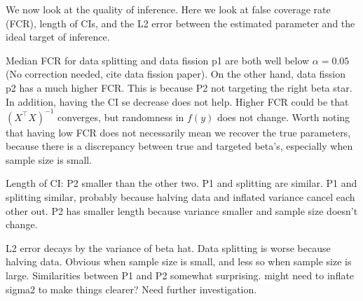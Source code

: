 We now look at the quality of inference. Here we look at false coverage rate (FCR), length of CIs, and the L2 error between the estimated parameter and the ideal target of inference.

Median FCR for data splitting and data fission p1 are both well below $\alpha = 0.05$ (No correction needed, cite data fission paper). On the other hand, data fission p2 has a much higher FCR. This is because P2 not targeting the right beta star. In addition, having the CI se decrease does not help. Higher FCR could be that $(X^\top X)^{-1}$ converges, but randomness in $f(y)$ does not change. Worth noting that having low FCR does not necessarily mean we recover the true parameters, because there is a discrepancy between true and targeted beta's, especially when sample size is small.

Length of CI: P2 smaller than the other two. P1 and splitting are similar. P1 and splitting similar, probably because halving data and inflated variance cancel each other out. P2 has smaller length because variance smaller and sample size doesn't change.

L2 error decays by the variance of beta hat. Data splitting is worse because halving data. Obvious when sample size is small, and less so when sample size is large. Similarities between P1 and P2 somewhat surprising. might need to inflate sigma2 to make things clearer? Need further investigation.